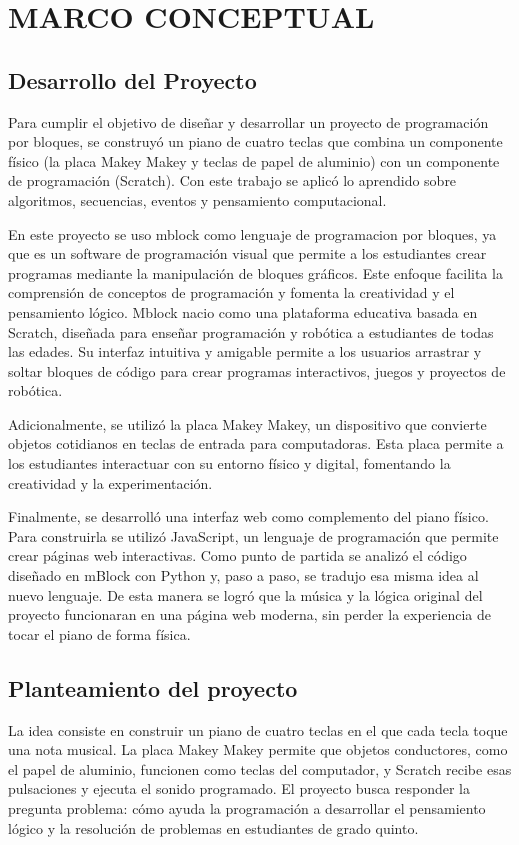 \documentclass[12pt,letterpaper]{article}
\begin{document}
\vspace{1em}
\section{\noindent\textbf{MARCO CONCEPTUAL}}

\subsection{Desarrollo del Proyecto}
Para cumplir el objetivo de diseñar y desarrollar un proyecto de programación por bloques, se construyó un piano de cuatro teclas que combina un componente físico (la placa Makey Makey y teclas de papel de aluminio) con un componente de programación (Scratch). Con este trabajo se aplicó lo aprendido sobre algoritmos, secuencias, eventos y pensamiento computacional.

En este proyecto se uso mblock como lenguaje de programacion por bloques, ya que es un software de programación visual que permite a los estudiantes crear programas mediante la manipulación de bloques gráficos. Este enfoque facilita la comprensión de conceptos de programación y fomenta la creatividad y el pensamiento lógico. Mblock nacio como una plataforma educativa basada en Scratch, diseñada para enseñar programación y robótica a estudiantes de todas las edades. Su interfaz intuitiva y amigable permite a los usuarios arrastrar y soltar bloques de código para crear programas interactivos, juegos y proyectos de robótica.

Adicionalmente, se utilizó la placa Makey Makey, un dispositivo que convierte objetos cotidianos en teclas de entrada para computadoras. Esta placa permite a los estudiantes interactuar con su entorno físico y digital, fomentando la creatividad y la experimentación.

Finalmente, se desarrolló una interfaz web como complemento del piano físico. Para construirla se utilizó JavaScript, un lenguaje de programación que permite crear páginas web interactivas. Como punto de partida se analizó el código diseñado en mBlock con Python y, paso a paso, se tradujo esa misma idea al nuevo lenguaje. De esta manera se logró que la música y la lógica original del proyecto funcionaran en una página web moderna, sin perder la experiencia de tocar el piano de forma física.

\clearpage
\subsection{Planteamiento del proyecto}
La idea consiste en construir un piano de cuatro teclas en el que cada tecla toque una nota musical. La placa Makey Makey permite que objetos conductores, como el papel de aluminio, funcionen como teclas del computador, y Scratch recibe esas pulsaciones y ejecuta el sonido programado. El proyecto busca responder la pregunta problema: cómo ayuda la programación a desarrollar el pensamiento lógico y la resolución de problemas en estudiantes de grado quinto.
\end{document}
